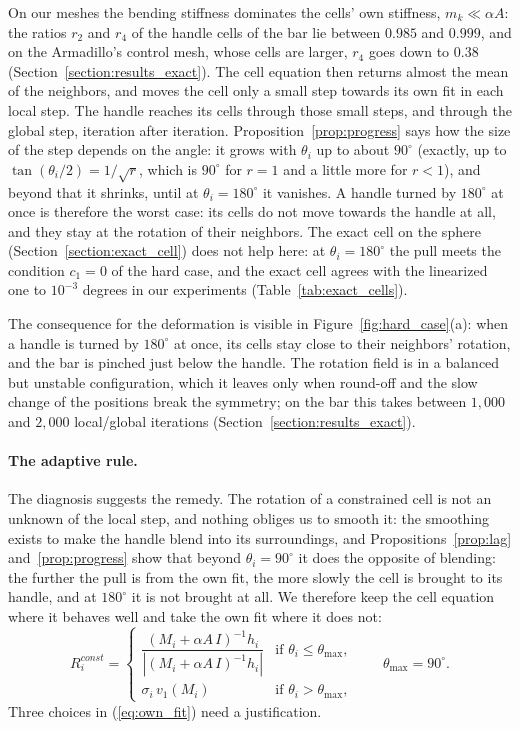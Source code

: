 \documentclass{birkjour}
\theoremstyle{remark}
\numberwithin{equation}{section}
\begin{document}
On our meshes the bending stiffness dominates the cells' own stiffness, $m_k \ll \alpha A$: the ratios $r_2$ and $r_4$ of the handle cells of the bar lie between $0.985$ and $0.999$, and on the Armadillo's control mesh, whose cells are larger, $r_4$ goes down to $0.38$ (Section~\ref{section:results_exact}). The cell equation then returns almost the mean of the neighbors, and moves the cell only a small step towards its own fit in each local step. The handle reaches its cells through those small steps, and through the global step, iteration after iteration. Proposition~\ref{prop:progress} says how the size of the step depends on the angle: it grows with $\theta_i$ up to about $90^\circ$ (exactly, up to $\tan(\theta_i/2) = 1/\sqrt r$, which is $90^\circ$ for $r = 1$ and a little more for $r < 1$), and beyond that it shrinks, until at $\theta_i = 180^\circ$ it vanishes. A handle turned by $180^\circ$ at once is therefore the worst case: its cells do not move towards the handle at all, and they stay at the rotation of their neighbors. The exact cell on the sphere (Section~\ref{section:exact_cell}) does not help here: at $\theta_i = 180^\circ$ the pull meets the condition $c_1 = 0$ of the hard case, and the exact cell agrees with the linearized one to $10^{-3}$ degrees in our experiments (Table~\ref{tab:exact_cells}).

The consequence for the deformation is visible in Figure~\ref{fig:hard_case}(a): when a handle is turned by $180^\circ$ at once, its cells stay close to their neighbors' rotation, and the bar is pinched just below the handle. The rotation field is in a balanced but unstable configuration, which it leaves only when round-off and the slow change of the positions break the symmetry; on the bar this takes between $1{,}000$ and $2{,}000$ local/global iterations (Section~\ref{section:results_exact}).

\paragraph{The adaptive rule.} The diagnosis suggests the remedy. The rotation of a constrained cell is not an unknown of the local step, and nothing obliges us to smooth it: the smoothing exists to make the handle blend into its surroundings, and Propositions~\ref{prop:lag} and~\ref{prop:progress} show that beyond $\theta_i = 90^\circ$ it does the opposite of blending: the further the pull is from the own fit, the more slowly the cell is brought to its handle, and at $180^\circ$ it is not brought at all. We therefore keep the cell equation where it behaves well and take the own fit where it does not:
\begin{equation}
\label{eq:own_fit}
R^{const}_i =
\begin{cases}
\dfrac{(M_i + \alpha A \, I)^{-1} h_i}{|(M_i + \alpha A \, I)^{-1} h_i|} & \text{if } \theta_i \leq \theta_{\max}, \\[2ex]
\sigma_i \, v_1(M_i) & \text{if } \theta_i > \theta_{\max},
\end{cases}
\qquad \theta_{\max} = 90^\circ .
\end{equation}
Three choices in (\ref{eq:own_fit}) need a justification.
\end{document}
